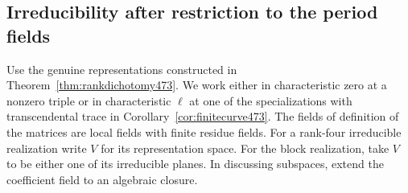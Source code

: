 \documentclass[a4paper,11pt]{article}
\theoremstyle{definition}
\theoremstyle{remark}
\numberwithin{equation}{section}
\begin{document}
\subsection{Irreducibility after restriction to the period fields}
\label{sec:strongtrace474}

Use the genuine representations constructed in
Theorem~\ref{thm:rankdichotomy473}. We work either in characteristic
zero at a nonzero triple or in characteristic \(\ell\) at one of
the specializations with transcendental trace in
Corollary~\ref{cor:finitecurve473}. The fields of definition of
the matrices are local fields with finite residue fields. For a
rank-four irreducible realization write \(V\) for its representation
space. For the block realization, take \(V\) to be either one of
its irreducible planes. In discussing subspaces, extend the
coefficient field to an algebraic closure.
\end{document}
